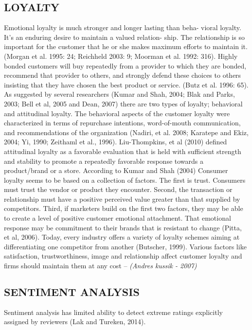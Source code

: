 \documentclass[a4paper, 12pt]{extarticle}
\begin{document}
{\subsection{LOYALTY}
\par Emotional loyalty is much stronger and longer lasting than beha- vioral loyalty. It's an enduring desire to maintain a valued relation- ship. The relationship is so important for the customer that he or she makes maximum efforts to maintain it. (Morgan et al. 1995: 24; Reichheld 2003: 9; Moorman et al. 1992: 316). Highly bonded customers will buy repeatedly from a provider to which they are bonded, recommend that provider to others, and strongly defend these choices to others insisting that they have chosen the best product or service. (Butz et al. 1996: 65). As suggested by several researchers (Kumar and Shah, 2004; Blak and Parks, 2003; Bell et al, 2005 and Dean, 2007) there are two types of loyalty; behavioral and attitudinal loyalty. The behavioral aspects of the customer loyalty were characterized in terms of repurchase intentions, word-of-mouth communication, and recommendations of the organization (Nadiri, et al. 2008; Karatepe and Ekiz, 2004; Yi, 1990; Zeithaml et al., 1996). Liu-Thompkins, et al (2010) defined attitudinal loyalty as a favorable evaluation that is held with sufficient strength and stability to promote a repeatedly favorable response towards a product/brand or a store. According to Kumar and Shah (2004) Consumer loyalty seems to be based on a collection of factors. The first is trust. Consumers must trust the vendor or product they encounter. Second, the transaction or relationship must have a positive perceived value greater than that supplied by competitors. Third, if marketers build on the first two factors, they may be able to create a level of positive customer emotional attachment. That emotional response may be commitment to their brands that is resistant to change (Pitta, et al, 2006). Today, every industry offers a variety of loyalty schemes aiming at differentiating one competitor from another (Butscher, 1999). Various factors like satisfaction, trustworthiness, image and relationship affect customer loyalty and firms should maintain them at any cost – \emph{(Andres kussik  - 2007)}

\subsection{SENTIMENT ANALYSIS}
Sentiment analysis has limited ability to detect extreme ratings explicitly assigned by reviewers (Lak and Tureken, 2014).



}
\end{document}
